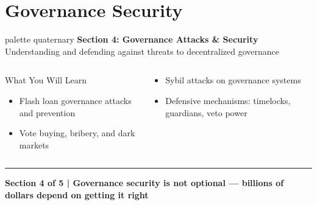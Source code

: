 \documentclass[8pt,aspectratio=169]{beamer}
\newcommand{\bottomnote}[1]{\vfill\vspace{-2mm}\textcolor{mllavender2}{\rule{\textwidth}{0.4pt}}\vspace{1mm}\footnotesize\textbf{#1}}
\begin{document}
\section{Governance Security}

\begin{frame}
\begin{center}
\begin{beamercolorbox}[sep=12pt,center,rounded=true,shadow=true]{palette quaternary}
{\Large\bfseries Section 4: Governance Attacks \& Security}\\[6pt]
{\normalsize Understanding and defending against threats to decentralized governance}
\end{beamercolorbox}

\vspace{4mm}
\begin{columns}[t]
\begin{block}{What You Will Learn}
\begin{itemize}
  \item Flash loan governance attacks and prevention
  \item Vote buying, bribery, and dark markets
\end{itemize}
\end{block}
\begin{block}{}
\begin{itemize}
  \item Sybil attacks on governance systems
  \item Defensive mechanisms: timelocks, guardians, veto power
\end{itemize}
\end{block}
\end{columns}
\end{center}
\bottomnote{Section 4 of 5 | Governance security is not optional --- billions of dollars depend on getting it right}
\end{frame}
\end{document}
